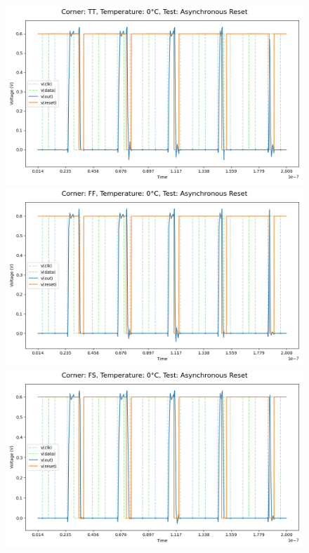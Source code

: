 \begin{figure}[H]
    \centering
    \includegraphics[height= 0.21\textheight]{figures/aimspice/TT/0/W2.csv.png}
    \vspace{5pt}
    \includegraphics[height= 0.21\textheight]{figures/aimspice/FF/0/W2.csv.png}
    \vspace{5pt}
    \includegraphics[height= 0.21\textheight]{figures/aimspice/FS/0/W2.csv.png}

\end{figure}
